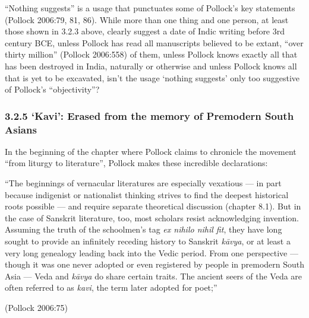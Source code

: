 \vskip -7pt

“Nothing suggests” is a usage that punctuates some of Pollock’s key statements (Pollock 2006:79, 81, 86). While more than one thing and one person, at least those shown in 3.2.3 above, clearly suggest a date of Indic writing before 3rd century BCE, unless Pollock has read all manuscripts believed to be extant, “over thirty million” (Pollock 2006:558) of them, unless Pollock knows exactly all that has been destroyed in India, naturally or otherwise and unless Pollock knows all that is yet to be excavated, isn’t the usage ‘nothing suggests’ only too suggestive of Pollock’s “objectivity”?


\subsubsection*{3.2.5 ‘Kavi’: Erased from the memory of Premodern South Asians}

\vskip -7pt

In the beginning of the chapter where Pollock claims to chronicle the movement “from liturgy to literature”, Pollock makes these incredible declarations:

\begin{myquote}
“The beginnings of vernacular literatures are especially vexatious — in part because indigenist or nationalist thinking strives to find the deepest historical roots possible — and require separate theoretical discussion (chapter 8.1). But in the case of Sanskrit literature, too, most scholars resist acknowledging invention. Assuming the truth of the schoolmen’s tag \textit{ex nihilo nihil fit}, they have long sought to provide an infinitely receding history to Sanskrit \textit{kāvya}, or at least a very long genealogy leading back into the Vedic period. From one perspective — though it was one never adopted or even registered by people in premodern South Asia — Veda and \textit{kāvya} do share certain traits. The ancient seers of the Veda are often referred to as \textit{kavi}, the term later adopted for poet;”
\end{myquote}

\hfill (Pollock 2006:75)

